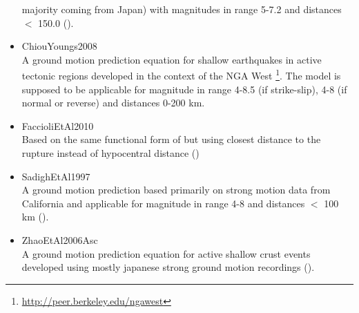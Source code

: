 \begin{itemize}
		majority coming from Japan) with magnitudes in
        range 5-7.2 and distances $<$ 150.0 (\cite{cauzzi2008}).
    \item ChiouYoungs2008 \hfill \\ A ground motion prediction equation 
        for shallow earthquakes in active tectonic regions developed in 
        the context of the NGA West \footnote{	
		\href{http://peer.berkeley.edu/ngawest/}{http://peer.berkeley.edu/ngawest}}.
        The model is supposed to be applicable for magnitude in range 4-8.5 (if 
		strike-slip), 4-8 (if normal or reverse) and distances 0-200 km.
    \item FaccioliEtAl2010 \hfill \\ Based on the same functional form of 
	    \cite{cauzzi2008} but using closest distance to the rupture instead of 
		hypocentral distance (\cite{faccioli2010})
    \item SadighEtAl1997 \hfill \\ A ground motion prediction based primarily 
	    on strong motion data 
        from California and applicable for magnitude in range 4-8 and distances 
		$<$ 100 km (\cite{sadigh1997}).
    \item ZhaoEtAl2006Asc \hfill \\ A ground motion prediction equation 
        for active shallow crust events developed using mostly japanese strong 
		ground motion recordings (\cite{zhao2006}).
\end{itemize}
%
